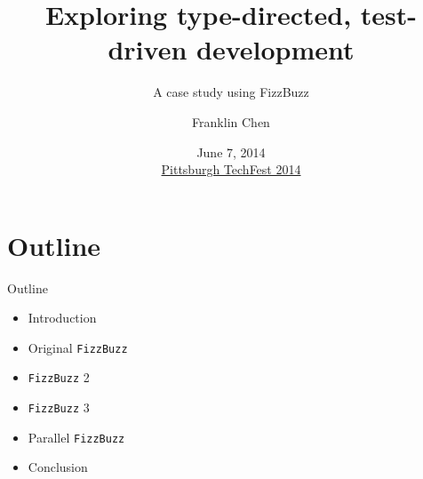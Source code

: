 
{
}

\usepackage[utf8]{inputenc}

\usepackage[cache]{minted}


\title{Exploring type-directed, test-driven development}
\subtitle{A case study using FizzBuzz}
\author{Franklin Chen}
\date[Pittsburgh TechFest 2014]{June 7, 2014 \\ \href{http://www.pghtechfest.com/}{Pittsburgh TechFest 2014}}

\subject{Talks}




\begin{frame}
  \titlepage
\end{frame}

\section*{Outline}

\begin{frame}{Outline}
  \begin{itemize}
  \item Introduction
  \item Original \texttt{FizzBuzz}
  \item \texttt{FizzBuzz} 2
  \item \texttt{FizzBuzz} 3
  \item Parallel \texttt{FizzBuzz}
  \item Conclusion
  \end{itemize}
\end{frame}



